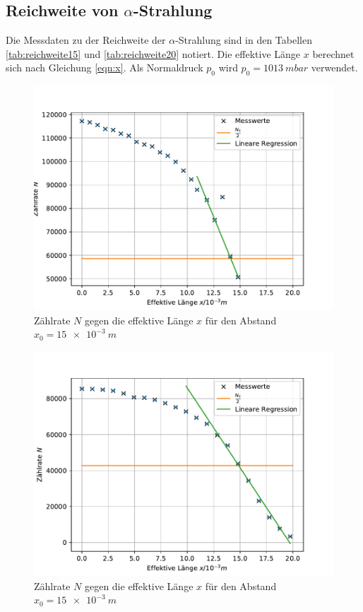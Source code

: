 \subsection{Reichweite von $\alpha$-Strahlung}
Die Messdaten zu der Reichweite der $\alpha$-Strahlung sind in den Tabellen \ref{tab:reichweite15} und \ref{tab:reichweite20} notiert.
Die effektive Länge $x$ berechnet sich nach Gleichung \eqref{eqn:x}.
Als Normaldruck $p_{\text{0}}$ wird $p_{\text{0}}=\SI{1013}{mbar}$ \cite{1} verwendet.

\begin{figure}[h!]
  \centering
  \includegraphics[width=\textwidth]{reichweite15.pdf}
  \caption{Zählrate $N$ gegen die effektive Länge $x$ für den Abstand $x_{\text{0}}=\SI{15e-3}{m}$}
  \label{fig:reichweite15}
\end{figure}

\begin{figure}[h!]
  \centering
  \includegraphics[width=\textwidth]{reichweite20.pdf}
  \caption{Zählrate $N$ gegen die effektive Länge $x$ für den Abstand $x_{\text{0}}=\SI{15e-3}{m}$}
  \label{fig:reichweite20}
\end{figure}
